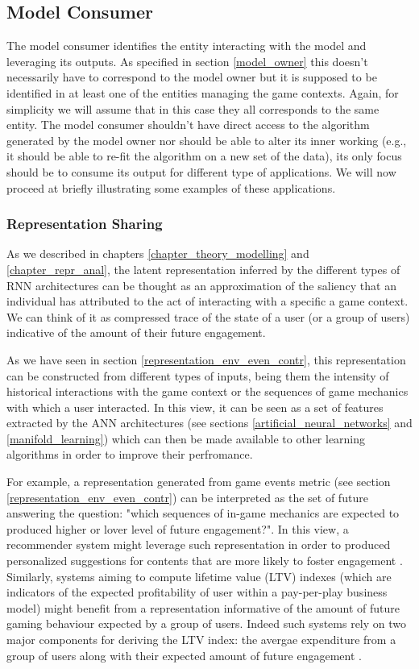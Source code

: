 \subsection{Model Consumer}
\label{model_consumer}
The model consumer identifies the entity interacting with the model and leveraging its outputs. As specified in section \ref{model_owner} this doesn't necessarily have to correspond to the model owner but it is supposed to be identified in at least one of the entities managing the game contexts. Again, for simplicity we will assume that in this case they all corresponds to the same entity. The model consumer shouldn't have direct access to the algorithm generated by the model owner nor should be able to alter its inner working (e.g., it should be able to re-fit the algorithm on a new set of the data), its only focus should be to consume its output for different type of applications. We will now proceed at briefly illustrating some examples of these applications.

\subsubsection{Representation Sharing}
\label{represenation_sharing}
As we described in chapters \ref{chapter_theory_modelling} and \ref{chapter_repr_anal}, the latent representation inferred by the different types of RNN architectures can be thought as an approximation of the saliency that an individual has attributed to the act of interacting with a specific a game context. We can think of it as compressed trace of the state of a user (or a group of users) indicative of the amount of their future engagement. 

As we have seen in section \ref{representation_env_even_contr}, this representation can be constructed from different types of inputs, being them the intensity of historical interactions with the game context or the sequences of game mechanics with which a user interacted. In this view, it can be seen as a set of features extracted by the ANN architectures (see sections \ref{artificial_neural_networks} and \ref{manifold_learning}) which can then be made available to other learning algorithms in order to improve their perfromance. 

For example, a representation generated from game events metric (see section \ref{representation_env_even_contr}) can be interpreted as the set of future answering the question: "which sequences of in-game mechanics are expected to produced higher or lover level of future engagement?". In this view, a recommender system might leverage such representation in order to produced personalized suggestions for contents that are more likely to foster engagement \cite{bertens2018machine}. Similarly, systems aiming to compute lifetime value (LTV) indexes (which are indicators of the expected profitability of user within a pay-per-play business model) might benefit from a representation informative of the  amount of future gaming behaviour expected by a group of users. Indeed such systems rely on two major components for deriving the LTV index: the avergae expenditure from a group of users along with their expected amount of future engagement \cite{chen2018customer}.

